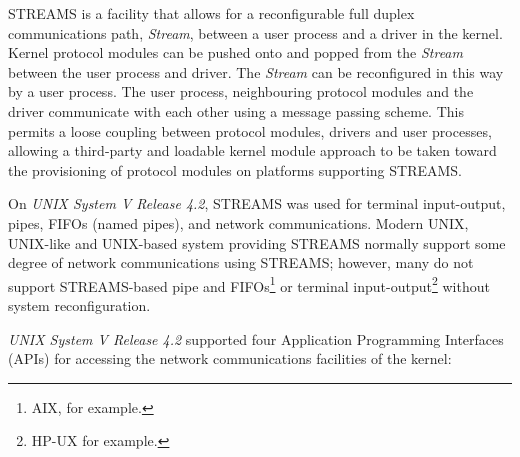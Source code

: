 \documentclass[letterpaper,final,notitlepage,twocolumn,10pt,twoside]{article}
\begin{document}
STREAMS is a facility that allows for a reconfigurable full duplex
communications path, \textit{Stream}, between a user process and a driver in
the kernel.  Kernel protocol modules can be pushed onto and popped from the
\textit{Stream} between the user process and driver.  The \textit{Stream} can
be reconfigured in this way by a user process.  The user process, neighbouring
protocol modules and the driver communicate with each other using a message
passing scheme.  This permits a loose coupling between protocol modules,
drivers and user processes, allowing a third-party and loadable kernel module
approach to be taken toward the provisioning of protocol modules on platforms
supporting STREAMS.

On \textsl{UNIX System V Release 4.2}, STREAMS was used for terminal
input-output, pipes, FIFOs (named pipes), and network communications.  Modern
UNIX, UNIX-like and UNIX-based system providing STREAMS normally support some
degree of network communications using STREAMS; however, many do not support
STREAMS-based pipe and FIFOs\footnote{AIX, for example.} or terminal
input-output\footnote{HP-UX for example.} without system reconfiguration.

\textsl{UNIX System V Release 4.2} supported four Application Programming
Interfaces (APIs) for accessing the network communications facilities of the
kernel:
\end{document}
